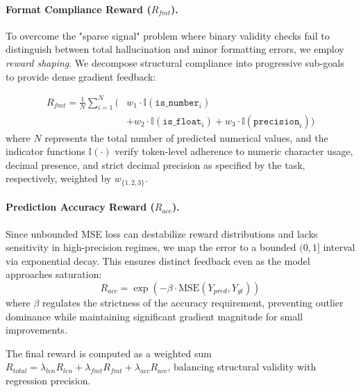 \paragraph{Format Compliance Reward ($R_{fmt}$).}
To overcome the "sparse signal" problem where binary validity checks fail to distinguish between total hallucination and minor formatting errors, we employ \textit{reward shaping}. We decompose structural compliance into progressive sub-goals to provide dense gradient feedback:

\begin{equation}
\begin{aligned}
 R_{fmt} = \frac{1}{N} \sum_{i=1}^{N} \Big(&w_1 \cdot \mathbb{I}(\texttt{is\_number}_i) \\
 &+w_2 \cdot \mathbb{I}(\texttt{is\_float}_i)+w_3 \cdot \mathbb{I}(\texttt{precision}_i)\Big)
 \end{aligned}
\end{equation}
where $N$ represents the total number of predicted numerical values, and the indicator functions $\mathbb{I}(\cdot)$ verify token-level adherence to numeric character usage, decimal presence, and strict decimal precision as specified by the task, respectively, weighted by $w_{\{1,2,3\}}$.


\paragraph{Prediction Accuracy Reward ($R_{acc}$).}
Since unbounded MSE loss can destabilize reward distributions and lacks sensitivity in high-precision regimes, we map the error to a bounded $(0, 1]$ interval via exponential decay. This ensures distinct feedback even as the model approaches saturation:
\begin{equation}
    R_{acc} = \exp(-\beta \cdot \text{MSE}(Y_{pred}, Y_{gt}))
\end{equation}
where $\beta$ regulates the strictness of the accuracy requirement, preventing outlier dominance while maintaining significant gradient magnitude for small improvements.

The final reward is computed as a weighted sum $R_{total} = \lambda_{len} R_{len} + \lambda_{fmt} R_{fmt} + \lambda_{acc} R_{acc}$, balancing structural validity with regression precision.
